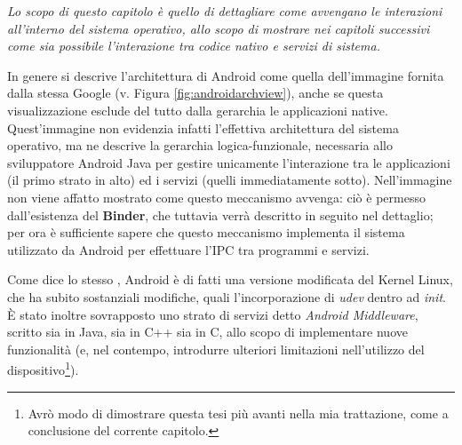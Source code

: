 \textit{Lo scopo di questo capitolo è quello di dettagliare come avvengano le interazioni
all'interno del sistema operativo, allo scopo di mostrare nei capitoli successivi
come sia possibile l'interazione tra codice nativo e servizi di sistema.}

In genere si descrive l'architettura di Android come quella dell'immagine fornita
dalla stessa Google (v. Figura  \vref{fig:androidarchview}), 
anche se questa visualizzazione esclude del tutto dalla gerarchia le applicazioni
native. Quest'immagine non evidenzia infatti l'effettiva architettura del sistema
operativo, ma ne descrive la gerarchia logica-funzionale, necessaria allo sviluppatore
Android Java per gestire unicamente l'interazione tra le applicazioni
(il primo strato in alto) ed i servizi (quelli immediatamente sotto).
Nell'immagine non viene affatto mostrato come questo meccanismo avvenga: ciò è permesso
dall'esistenza del \textbf{Binder}, che tuttavia verrà descritto in 
seguito nel dettaglio; per ora è sufficiente sapere che questo meccanismo implementa
il sistema utilizzato da Android per effettuare l'IPC tra
programmi e servizi.

Come dice lo stesso \parencite{art:notdroid}, Android è di fatti una versione
modificata del Kernel Linux, 
che ha subito sostanziali modifiche, quali l'incorporazione di \textit{udev} dentro
ad \textit{init}. È stato inoltre sovrapposto uno strato di servizi
 detto \textit{Android Middleware}, scritto sia in Java, sia in C++ sia in C, 
allo scopo di implementare nuove funzionalità (e, nel contempo, introdurre 
ulteriori limitazioni nell'utilizzo del dispositivo\footnote{Avrò modo di 
dimostrare questa tesi più avanti nella mia trattazione, come a conclusione
del corrente capitolo.
}).

